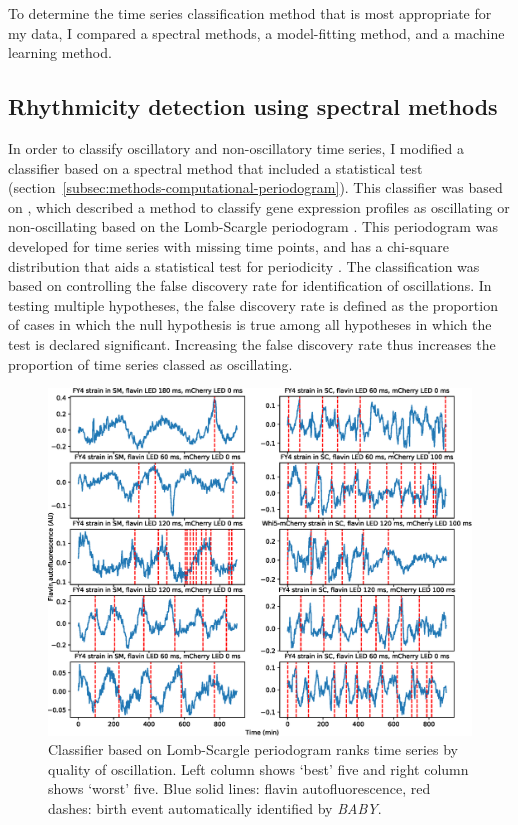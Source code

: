 To determine the time series classification method that is most appropriate for my data, I compared a  spectral methods, a model-fitting method, and a machine learning method.


\subsection{Rhythmicity detection using spectral methods}
\label{subsec:analysis-classification-spectral}

In order to classify oscillatory and non-oscillatory time series, I modified a classifier based on a spectral method that included a statistical test (section~\ref{subsec:methods-computational-periodogram}).
This classifier was based on \textcite{glynnDetectingPeriodicPatterns2006a}, which described a method to classify gene expression profiles as oscillating or non-oscillating based on the Lomb-Scargle periodogram \parencite{lombLeastsquaresFrequencyAnalysis1976}.
This periodogram was developed for time series with missing time points, and has a chi-square distribution that aids a statistical test for periodicity \parencite{scargleStudiesAstronomicalTime1982}.
The classification was based on controlling the false discovery rate for identification of oscillations.
In testing multiple hypotheses, the false discovery rate is defined as the proportion of cases in which the null hypothesis is true among all hypotheses in which the test is declared significant.
Increasing the false discovery rate thus increases the proportion of time series classed as oscillating.

\begin{figure}[htbp]
  \centering
  \includegraphics[width=\textwidth]{10m_ClassifierBestWorstTS}
  \caption[
    Classifier based on Lomb-Scargle periodogram ranks time series by quality of oscillation
  ]{
    Classifier based on Lomb-Scargle periodogram ranks time series by quality of oscillation.
    Left column shows `best' five and right column shows `worst' five.
    Blue solid lines: flavin autofluorescence, red dashes: birth event automatically identified by \textit{BABY}.
  }
  \label{fig:ClassifierBestWorstTS}
\end{figure}

